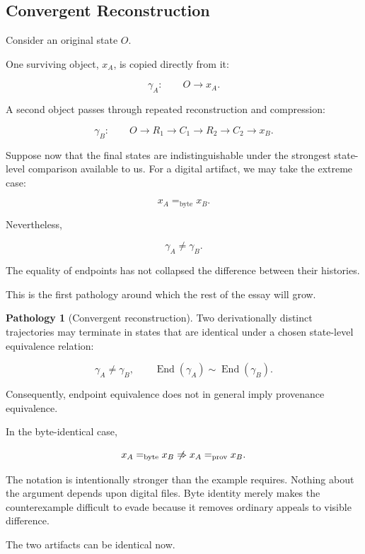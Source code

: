\documentclass[
  11pt,
  a4paper,
  DIV=12,
  BCOR=0mm,
  parskip=half-
]{scrartcl}
\newcommand{\eqbyte}{=_{\mathrm{byte}}}
\newcommand{\eqprov}{=_{\mathrm{prov}}}
\newcommand{\End}{\operatorname{End}}
\newcommand{\nimplies}{%
  \centernot\Rightarrow
}
\theoremstyle{definition}
\newtheorem{pathology}[definition]{Pathology}
\theoremstyle{plain}
\theoremstyle{remark}
\begin{document}
\subsection{Convergent Reconstruction}
\label{sec:convergent-reconstruction}

Consider an original state \(O\).

One surviving object, \(x_A\), is copied directly from it:

\[
  \gamma_A:
  \qquad
  O\longrightarrow x_A.
\]

A second object passes through repeated reconstruction and compression:

\[
  \gamma_B:
  \qquad
  O
  \longrightarrow R_1
  \longrightarrow C_1
  \longrightarrow R_2
  \longrightarrow C_2
  \longrightarrow x_B.
\]

Suppose now that the final states are indistinguishable under the strongest
state-level comparison available to us. For a digital artifact, we may take
the extreme case:

\[
  x_A \eqbyte x_B.
\]

Nevertheless,

\[
  \gamma_A\neq\gamma_B.
\]

The equality of endpoints has not collapsed the difference between their
histories.

This is the first pathology around which the rest of the essay will grow.

\begin{pathology}[Convergent reconstruction]
\label{path:convergent-reconstruction}
Two derivationally distinct trajectories may terminate in states that are
identical under a chosen state-level equivalence relation:

\[
  \gamma_A\neq\gamma_B,
  \qquad
  \End(\gamma_A)\sim\End(\gamma_B).
\]

Consequently, endpoint equivalence does not in general imply provenance
equivalence.
\end{pathology}

In the byte-identical case,

\[
  x_A\eqbyte x_B
  \nimplies
  x_A\eqprov x_B.
\]

The notation is intentionally stronger than the example requires. Nothing
about the argument depends upon digital files. Byte identity merely makes the
counterexample difficult to evade because it removes ordinary appeals to
visible difference.

The two artifacts can be identical now.
\end{document}
